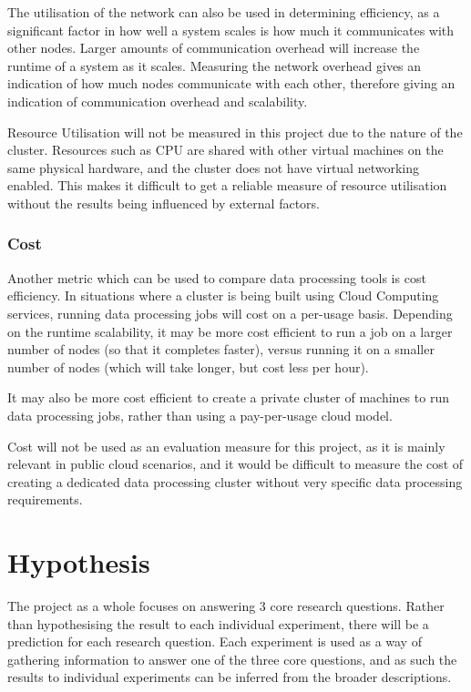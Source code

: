 The utilisation of the network can also be used in determining efficiency, as a significant factor in how well a system scales is how much it communicates with other nodes. Larger amounts of communication overhead will increase the runtime of a system as it scales. Measuring the network overhead gives an indication of how much nodes communicate with each other, therefore giving an indication of communication overhead and scalability.

Resource Utilisation will not be measured in this project due to the nature of the cluster. Resources such as CPU are shared with other virtual machines on the same physical hardware, and the cluster does not have virtual networking enabled. This makes it difficult to get a reliable measure of resource utilisation without the results being influenced by external factors.

\subsubsection{Cost}
Another metric which can be used to compare data processing tools is cost efficiency. In situations where a cluster is being built using Cloud Computing services, running data processing jobs will cost on a per-usage basis. Depending on the runtime scalability, it may be more cost efficient to run a job on a larger number of nodes (so that it completes faster), versus running it on a smaller number of nodes (which will take longer, but cost less per hour). 

It may also be more cost efficient to create a private cluster of machines to run data processing jobs, rather than using a pay-per-usage cloud model.

Cost will not be used as an evaluation measure for this project, as it is mainly relevant in public cloud scenarios, and it would be difficult to measure the cost of creating a dedicated data processing cluster without very specific data processing requirements. 

\section{Hypothesis}
The project as a whole focuses on answering 3 core research questions. Rather than hypothesising the result to each individual experiment, there will be a prediction for each research question. Each experiment is used as a way of gathering information to answer one of the three core questions, and as such the results to individual experiments can be inferred from the broader descriptions.

